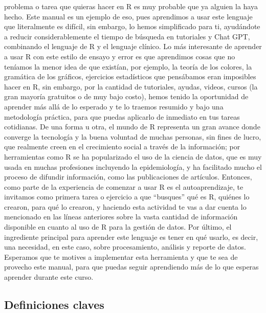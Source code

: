 \documentclass[
  letterpaper,
  DIV=11,
  numbers=noendperiod]{scrreprt}
\begin{document}
problema o tarea que quieras hacer en R es muy probable que ya alguien
la haya hecho. Este manual es un ejemplo de eso, pues aprendimos a usar
este lenguaje que literalmente es difícil, sin embargo, lo hemos
simplificado para ti, ayudándote a reducir considerablemente el tiempo
de búsqueda en tutoriales y Chat GPT, combinando el lenguaje de R y el
lenguaje clínico. Lo más interesante de aprender a usar R con este
estilo de ensayo y error es que aprendimos cosas que no teníamos la
menor idea de que existían, por ejemplo, la teoría de los colores, la
gramática de los gráficos, ejercicios estadísticos que pensábamos eran
imposibles hacer en R, sin embargo, por la cantidad de tutoriales,
ayudas, videos, cursos (la gran mayoría gratuitos o de muy bajo costo),
hemos tenido la oportunidad de aprender más allá de lo esperado y te lo
traemos resumido y bajo una metodología práctica, para que puedas
aplicarlo de inmediato en tus tareas cotidianas. De una forma u otra, el
mundo de R representa un gran avance donde converge la tecnología y la
buena voluntad de muchas personas, sin fines de lucro, que realmente
creen en el crecimiento social a través de la información; por
herramientas como R se ha popularizado el uso de la ciencia de datos,
que es muy usada en muchas profesiones incluyendo la epidemiología, y ha
facilitado mucho el proceso de difundir información, como las
publicaciones de artículos. Entonces, como parte de la experiencia de
comenzar a usar R es el autoaprendizaje, te invitamos como primera tarea
o ejercicio a que ``busques'' qué es R, quiénes lo crearon, para qué lo
crearon, y haciendo esta actividad te vas a dar cuenta lo mencionado en
las líneas anteriores sobre la vasta cantidad de información disponible
en cuanto al uso de R para la gestión de datos. Por último, el
ingrediente principal para aprender este lenguaje es tener en qué
usarlo, es decir, una necesidad, en este caso, sobre procesamiento,
análisis y reporte de datos. Esperamos que te motives a implementar esta
herramienta y que te sea de provecho este manual, para que puedas seguir
aprendiendo más de lo que esperas aprender durante este curso.

\subsection{Definiciones claves}\label{definiciones-claves}
\end{document}
